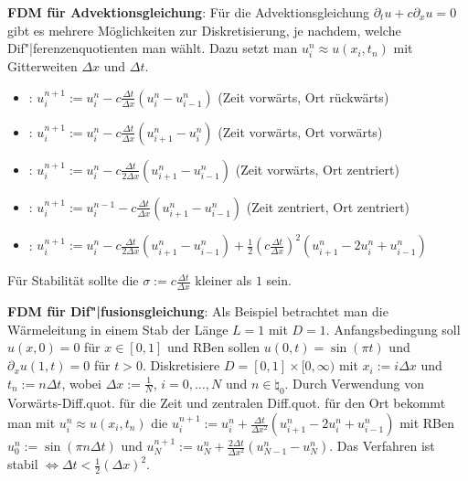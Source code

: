\linie

\textbf{FDM für Advektionsgleichung}:
Für die Advektionsgleichung $\partial_t u + c \partial_x u = 0$ gibt es mehrere
Möglichkeiten zur Diskretisierung, je nachdem, welche Dif"|ferenzenquotienten man wählt.
Dazu setzt man $u_i^n \approx u(x_i, t_n)$ mit Gitterweiten $\Delta x$ und $\Delta t$.
\begin{itemize}
    \item
    :
    $u_i^{n+1} := u_i^n - c \frac{\Delta t}{\Delta x} (u_i^n - u_{i-1}^n)$
    (Zeit vorwärts, Ort rückwärts)

    \item
    :
    $u_i^{n+1} := u_i^n - c \frac{\Delta t}{\Delta x} (u_{i+1}^n - u_i^n)$
    (Zeit vorwärts, Ort vorwärts)

    \item
    :
    $u_i^{n+1} := u_i^n - c \frac{\Delta t}{2 \Delta x} (u_{i+1}^n - u_{i-1}^n)$
    (Zeit vorwärts, Ort zentriert)

    \item
    :
    $u_i^{n+1} := u_i^{n-1} - c \frac{\Delta t}{\Delta x} (u_{i+1}^n - u_{i-1}^n)$
    (Zeit zentriert, Ort zentriert)

    \item
    :
    $u_i^{n+1} := u_i^n - c \frac{\Delta t}{2 \Delta x} (u_{i+1}^n - u_{i-1}^n) +
    \frac{1}{2} (c \frac{\Delta t}{\Delta x})^2 (u_{i+1}^n - 2u_i^n + u_{i-1}^n)$
\end{itemize}
Für Stabilität sollte die 
$\sigma := c \frac{\Delta t}{\Delta x}$ kleiner als $1$ sein.

\linie

\textbf{FDM für Dif"|fusionsgleichung}:
Als Beispiel betrachtet man die Wärmeleitung in einem Stab der Länge $L = 1$ mit $D = 1$.
Anfangsbedingung soll $u(x, 0) = 0$ für $x \in [0, 1]$ und
RBen sollen $u(0, t) = \sin(\pi t)$ und $\partial_x u(1, t) = 0$ für $t > 0$.
Diskretisiere $D = [0, 1] \times [0, \infty)$ mit $x_i := i \Delta x$ und $t_n := n \Delta t$,
wobei $\Delta x := \frac{1}{N}$, $i = 0, \dotsc, N$ und $n \in \natural_0$.
Durch Verwendung von Vorwärts-Diff.quot. für die Zeit und zentralen Diff.quot. für den Ort
bekommt man mit $u_i^n \approx u(x_i, t_n)$ die 
$u_i^{n+1} := u_i^n + \frac{\Delta t}{\Delta x^2} (u_{i+1}^n - 2u_i^n + u_{i-1}^n)$
mit RBen $u_0^n := \sin(\pi n \Delta t)$ und
$u_N^{n+1} := u_N^n + \frac{2\Delta t}{\Delta x^2} (u_{N-1}^n - u_N^n)$.
Das Verfahren ist stabil $\iff \Delta t < \frac{1}{2} (\Delta x)^2$.

